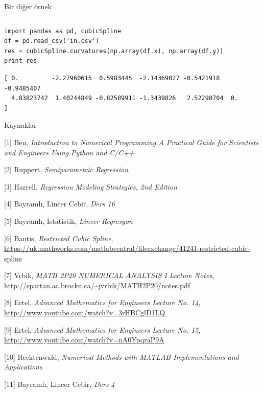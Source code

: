 \documentclass[12pt,fleqn]{article}\usepackage{../../common}
\begin{document}
Bir diğer örnek

\inputminted[fontsize=\footnotesize]{python}{cubicSpline.py}

\begin{verbatim}
import pandas as pd, cubicSpline
df = pd.read_csv('in.csv')
res = cubicSpline.curvatures(np.array(df.x), np.array(df.y))
print res
\end{verbatim}

\begin{verbatim}
[ 0.         -2.27960615  0.5983445  -2.14369027 -0.5421918  -0.9485407
  4.83823742  1.40244849 -0.82589911 -1.3439826   2.52298704  0.        ]
\end{verbatim}

Kaynaklar

[1] Beu, {\em Introduction to Numerical Programming A Practical Guide for Scientists and Engineers Using Python and C/C++}

[2] Ruppert, {\em Semiparametric Regression}

[3] Harrell, {\em Regression Modeling Strategies, 2nd Edition}

[4] Bayramlı, Lineer Cebir, {\em Ders 16}

[5] Bayramlı, İstatistik, {\em Lineer Regresyon}

[6] Bantis, {\em Restricted Cubic Spline}, \url{https://uk.mathworks.com/matlabcentral/fileexchange/41241-restricted-cubic-spline}

[7] Vrbik, {\em MATH 2P20 NUMERICAL ANALYSIS I Lecture Notes}, \url{http://spartan.ac.brocku.ca/~jvrbik/MATH2P20/notes.pdf}

[8] Ertel, {\em Advanced Mathematics for Engineers Lecture No. 14}, \url{http://www.youtube.com/watch?v=3rHBCglD1LQ}

[9] Ertel, {\em Advanced Mathematics for Engineers Lecture No. 15}, \url{http://www.youtube.com/watch?v=nA0YpqraP9A}

[10] Recktenwald, {\em Numerical Methods with MATLAB Implementations and Applications}

[11] Bayramlı, Lineer Cebir, {\em Ders 4}
\end{document}
